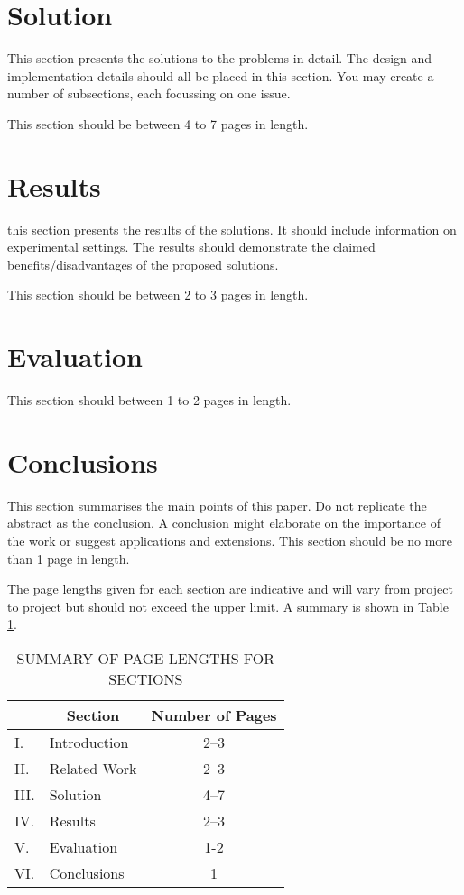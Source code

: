 \documentclass[12pt,a4paper]{article}
\begin{document}
\section{Solution}

This section presents the solutions to the problems in detail.  The design and implementation details should all be placed in this section.  You may create a number of subsections, each focussing on one issue.  

This section should be between 4 to 7 pages in length.

\section{Results}

this section presents the results of the solutions.  It should include information on experimental settings.  The results should demonstrate the claimed benefits/disadvantages of the proposed solutions.

This section should be between 2 to 3 pages in length.

\section{Evaluation}

This section should between 1 to 2 pages in length.

\section{Conclusions}

This section summarises the main points of this paper.  Do not replicate the abstract as the conclusion.  A conclusion might elaborate on the importance of the work or suggest applications and extensions.  This section should be no more than 1 page in length.

The page lengths given for each section are indicative and will vary from project to project but should not exceed the upper limit.  A summary is shown in Table \ref{summary}.

\begin{table}[htb]
\centering
\caption{SUMMARY OF PAGE LENGTHS FOR SECTIONS}
\vspace*{6pt}
\label{summary}
\begin{tabular}{|ll|c|} \hline
& \multicolumn{1}{c|}{\bf Section} & {\bf Number of Pages} \\ \hline
I. & Introduction & 2--3 \\ \hline
II. & Related Work & 2--3 \\ \hline
III. & Solution & 4--7 \\ \hline
IV. & Results & 2--3 \\ \hline
V. & Evaluation & 1-2 \\ \hline
VI. & Conclusions & 1 \\ \hline
\end{tabular}
\end{table}



\end{document}

